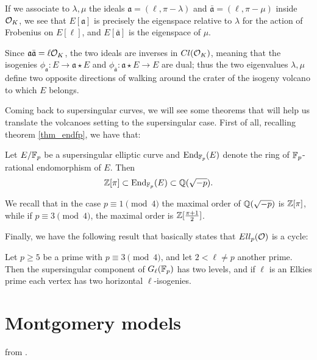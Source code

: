 If we associate to $\lambda,\mu$ the ideals $\mathfrak{a}=(\ell,\pi-\lambda)$ and $\bar{\mathfrak{a}}=(\ell,\pi-\mu)$ inside $\mathcal{O}_K$, we see that $E[\mathfrak{a}]$ is precisely the eigenspace relative to $\lambda$ for the action of Frobenius on $E[\ell]$, and $E[\bar{\mathfrak{a}}]$ is the eigenspace of $\mu$.

Since $\mathfrak{a}\bar{\mathfrak{a}}=\ell\mathcal{O}_K$, the two ideals are inverses in $Cl(\mathcal{O}_K)$, meaning that the isogenies $\phi_{\mathfrak{a}}:E\to \mathfrak{a}\star E$ and $\phi_{\bar{\mathfrak{a}}}:\mathfrak{a}\star E\to E$ are dual; thus the two eigenvalues $\lambda,\mu$ define two opposite directions of walking around the crater of the isogeny volcano to which $E$ belongs.

Coming back to supersingular curves, we will see some theorems that will help us translate the volcanoes setting to the supersingular case. First of all, recalling theorem \ref{thm_endfp}, we have that:

\begin{proposition}
    Let $E/\mathbb{F}_p$ be a supersingular elliptic curve and $\operatorname{End}_{\mathbb{F}_p}(E)$ denote the ring of $\mathbb{F}_p$-rational endomorphism of $E$. Then $$\mathbb{Z}[\pi]\subset \operatorname{End}_{\mathbb{F}_p}(E) \subset \mathbb{Q}(\sqrt{-p}).$$
\end{proposition}

We recall that in the case $p\equiv1\pmod 4$ the maximal order of $\mathbb{Q}(\sqrt{-p})$ is $\mathbb{Z}[\pi]$, while if $p\equiv 3\pmod 4$, the maximal order is $\mathbb{Z}[\frac{\pi+1}{2}]$.

Finally, we have the following result that basically states that $Ell_p(\mathcal{O})$ is a cycle:

\begin{theorem}\label{CSIDH_cycle}
    Let $p\ge 5$ be a prime with $p\equiv3\pmod{4}$, and let $2<\ell\neq p$ another prime. Then the supersingular component of $G_\ell(\mathbb{F}_p)$ has two levels, and if $\ell$ is an Elkies prime each vertex has two horizontal $\ell$-isogenies.
\end{theorem}



\section{Montgomery models}
\cite{Costello_Montgomery} from \cite{Montgomery_curve}.

